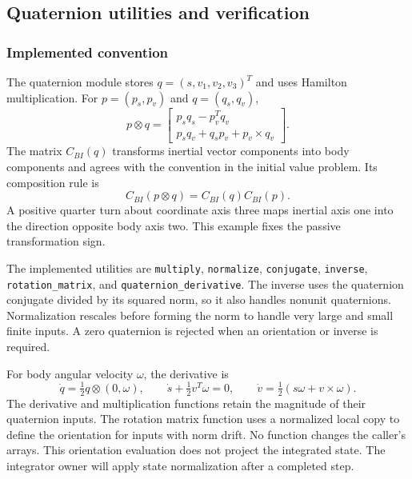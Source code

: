 \subsection{Quaternion utilities and verification}

\subsubsection{Implemented convention}
The quaternion module stores \(q=(s,v_1,v_2,v_3)^T\) and uses Hamilton multiplication. For \(p=(p_s,p_v)\) and \(q=(q_s,q_v)\),
\[
p\otimes q=
\begin{bmatrix}
p_sq_s-p_v^Tq_v\\
p_sq_v+q_sp_v+p_v\times q_v
\end{bmatrix}.
\]
The matrix \(C_{BI}(q)\) transforms inertial vector components into body components and agrees with the convention in the initial value problem. Its composition rule is
\[
C_{BI}(p\otimes q)=C_{BI}(q)C_{BI}(p).
\]
A positive quarter turn about coordinate axis three maps inertial axis one into the direction opposite body axis two. This example fixes the passive transformation sign.

The implemented utilities are \texttt{multiply}, \texttt{normalize}, \texttt{conjugate}, \texttt{inverse}, \texttt{rotation\_matrix}, and \texttt{quaternion\_derivative}. The inverse uses the quaternion conjugate divided by its squared norm, so it also handles nonunit quaternions. Normalization rescales before forming the norm to handle very large and small finite inputs. A zero quaternion is rejected when an orientation or inverse is required.

For body angular velocity \(\omega\), the derivative is
\[
\dot q=\tfrac12 q\otimes(0,\omega),
\qquad
\dot s+\tfrac12 v^T\omega=0,
\qquad
\dot v=\tfrac12(s\omega+v\times\omega).
\]
The derivative and multiplication functions retain the magnitude of their quaternion inputs. The rotation matrix function uses a normalized local copy to define the orientation for inputs with norm drift. No function changes the caller's arrays. This orientation evaluation does not project the integrated state. The integrator owner will apply state normalization after a completed step.

